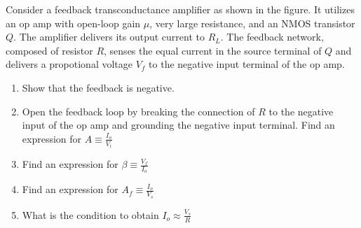 Consider a feedback transconductance amplifier as shown in the figure. It utilizes an op amp with open-loop gain $\mu$, very large resistance, and an NMOS transistor $Q$. The amplifier delivers its output current to $R_L$. The feedback network, composed of resistor $R$, senses the equal current in the source terminal of $Q$ and delivers a propotional voltage $V_f$  to the negative input terminal of the op amp.

\begin{figure}[ht!]
	\begin{center}
	    \resizebox{\columnwidth/1}{!}{}
	\end{center}
	\caption{}
	\label{fig:es17btech11015_fige}
\end{figure}

\begin{enumerate}[label=\arabic*.,ref=\theenumi]
\item Show that the feedback is negative.
\item Open the feedback loop by breaking the connection of $R$ to the negative input of the op amp and grounding the negative input terminal. Find an expression for $A \equiv \frac{I_o}{V_i}$
\item Find an expression for $\beta \equiv \frac{V_f}{I_o}$
\item Find an expression for $A_f \equiv \frac{I_o}{V_s}$
\item What is the condition to obtain $I_o\approx\frac{V_s}{R}$
\end{enumerate}\newpage
